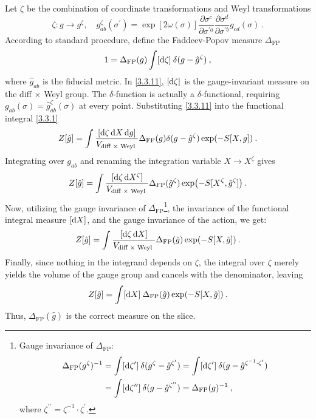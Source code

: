 Let $\zeta$ be the combination of coordinate transformations and Weyl transformations    
\begin{equation}
	\zeta: g \rightarrow g^{\zeta}, \quad g_{a b}^{\zeta}(\sigma^{\prime}) = 
	\exp [2 \omega(\sigma)] \frac{\partial \sigma^{c}}{\partial \sigma^{\prime a}} \frac{\partial \sigma^{d}}{\partial \sigma^{\prime b}} g_{c d}(\sigma) \:.
	\label{3.3.10}
\end{equation}
According to standard procedure, define the Faddeev-Popov measure $\Delta_{\mathrm{FP}}$    
\begin{equation}\label{3.3.11}
	1=\Delta_{\mathrm{FP}}(g) \int[\mathrm{d} \zeta] \: \delta(g-\hat{g}^{\zeta}) \:, 
\end{equation}
where $\hat{g}_{a b}$ is the fiducial metric. In \eqref{3.3.11}, $[\mathrm{d} \zeta]$ is the gauge-invariant measure on the diff $\times$ Weyl group. The $\delta$-function is actually a $\delta$-functional, requiring $g_{a b}(\sigma)=\hat{g}_{a b}^{\zeta}(\sigma)$ at every point.    
Substituting \eqref{3.3.11} into the functional integral \eqref{3.3.1}    
\begin{equation}
	Z[\hat{g}]=\int \frac{[\mathrm{d} \zeta \,\mathrm{d} X \,\mathrm{d} g]}{V_{\text {diff } \times \text { Weyl }}}  \Delta_{\mathrm{FP}}(g) \delta(g-\hat{g}^{\zeta}) \exp (-S[X, g]) \:.
	\label{3.3.12}
\end{equation}
Integrating over $g_{ab}$ and renaming the integration variable $X \to X^{\zeta}$ gives    
\begin{equation}
	Z[\hat{g}]=\int \frac{[\mathrm{d} \zeta\, \mathrm{d} X^{\zeta}]}{V_{\text {diff } \times \text { Weyl }}} \Delta_{\mathrm{FP}}(\hat{g}^{\zeta}) \exp (-S[X^{\zeta}, \hat{g}^{\zeta}]) \:.
	\label{3.3.13}
\end{equation}
Now, utilizing the gauge invariance of $\Delta_{\mathrm{FP}}$\footnote{Gauge invariance of $\Delta_{\mathrm{FP}}$: 
	\begin{align*}
		\Delta_{\mathrm{FP}}(g^{\zeta})^{-1} &=\int[\mathrm{d} \zeta^{\prime}] \: \delta(g^{\zeta}-\hat{g}^{\zeta^{\prime}})
		=\int[\mathrm{d} \zeta^{\prime}]\: \delta(g-\hat{g}^{\zeta^{-1} \cdot \zeta^{\prime}}) \\
		&=\int[\mathrm{d} \zeta^{\prime \prime}] \: \delta(g-\hat{g}^{\zeta^{\prime \prime}})=\Delta_{\mathrm{FP}}(g)^{-1} \:,
	\end{align*}
	where $\zeta^{\prime \prime}=\zeta^{-1} \cdot \zeta^{\prime} $.}, the invariance of the functional integral measure $[\mathrm{d} X]$, and the gauge invariance of the action, we get:    
\begin{equation}
	Z[\hat{g}]=\int \frac{[\mathrm{d} \zeta\, \mathrm{d} X]}{V_{\text {diff } \times \text { Weyl }}} \Delta_{\mathrm{FP}}(\hat{g}) \exp (-S[X, \hat{g}]) \:.
	\label{3.3.14}
\end{equation}
Finally, since nothing in the integrand depends on $\zeta$, the integral over $\zeta$ merely yields the volume of the gauge group and cancels with the denominator, leaving    
\begin{equation}
	Z[\hat{g}]=\int[\mathrm{d} X] \: \Delta_{\mathrm{FP}}(\hat{g}) \exp (-S[X, \hat{g}]) \:. \label{3.3.15}
\end{equation}
Thus, $\Delta_{\mathrm{FP}}(\hat{g})$ is the correct measure on the slice.    

